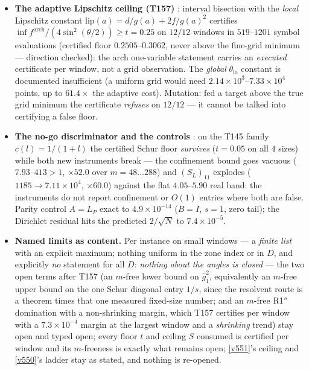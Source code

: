 \documentclass[11pt,a4paper]{article}
\begin{document}
\begin{itemize}[leftmargin=1.5em]
$1/s\le(S_L)_{11}$ on $12/12$: $1/s=4.0460$--$5.8962$ is an $O(1)$ number carried by
\emph{one} fixed-size object, so T156's R2$''$ loss ceiling $r\le1/(Ls)$ is a statement
about one entry. Negative control (T157's refutation wired as a check): the
inversion-free Cauchy--Schwarz ceiling $\hat a-\|b\|^4/(b^{\mathsf T}B_{HH}b)$ is valid
and \emph{useless}, off by $250$--$7.27\times10^{3}$ ($\hat
a=1.13\times10^{3}$--$3.11\times10^{4}$ is the same entry \emph{without} the Schur
subtraction) --- the cancellation in $b^{\mathsf T}B_{HH}^{-1}b$ is nearly complete and
Cauchy--Schwarz cannot see it. Mutation: a one-index shift breaks the identity by
$1.55$--$2.15$.
\item \textbf{The adaptive Lipschitz ceiling (T157)} \mE: interval bisection with the
\emph{local} Lipschitz constant $\mathrm{lip}(a)=d/g(a)+2f/g(a)^2$ certifies
$\inf f^{\mathrm{arch}}/(4\sin^2(\theta/2))\ge t=0.25$ on $12/12$ windows in
$519$--$1201$ symbol evaluations (certified floor $0.2505$--$0.3062$, never above the
fine-grid minimum --- direction checked): the arch one-variable statement carries an
\emph{executed} certificate per window, not a grid observation. The \emph{global}
$\theta_{\mathrm{lo}}$ constant is documented insufficient (a uniform grid would need
$2.14\times10^{3}$--$7.33\times10^{4}$ points, up to $61.4\times$ the adaptive cost).
Mutation: fed a target above the true grid minimum the certificate \emph{refuses} on
$12/12$ --- it cannot be talked into certifying a false floor.
\item \textbf{The no-go discriminator and the controls} \mE: on the T145 family
$c(l)=1/(1+l)$ the certified Schur floor \emph{survives} ($t=0.05$ on all $4$ sizes)
while both new instruments break --- the confinement bound goes vacuous
($7.93$--$413>1$, $\times52.0$ over $m=48\ldots288$) and $(S_L)_{11}$ explodes
($1185\to7.11\times10^{4}$, $\times60.0$) against the flat $4.05$--$5.90$ real band: the
instruments do not report confinement or $O(1)$ entries where both are false. Parity
control $A=L_P$ exact to $4.9\times10^{-14}$ ($B=I$, $s=1$, zero tail); the Dirichlet
residual hits the predicted $2/\sqrt N$ to $7.4\times10^{-5}$.
\item \textbf{Named limits as content.} Per instance on small windows --- a \emph{finite
list} with an explicit maximum; nothing uniform in the zone index or in $D$, and
explicitly \emph{no} statement for all $D$: \emph{nothing about the angles is closed} ---
the two open terms after T157 (an $m$-free lower bound on $\hat g_1^2$, equivalently an
$m$-free upper bound on the one Schur diagonal entry $1/s$, since the resolvent route is
a theorem times that one measured fixed-size number; and an $m$-free R1$''$ domination
with a non-shrinking margin, which T157 certifies per window with a $7.3\times10^{-4}$
margin at the largest window and a \emph{shrinking} trend) stay open and typed open;
every floor $t$ and ceiling $S$ consumed is certified per window and its $m$-freeness is
exactly what remains open; \vref{v551}'s ceiling and \vref{v550}'s ladder stay as stated,
and nothing is re-opened.
\end{itemize}
\end{document}
